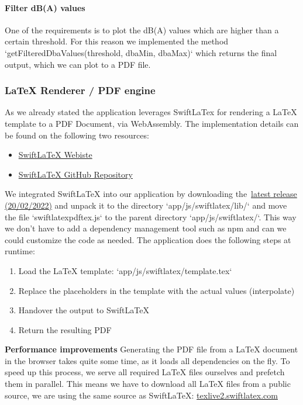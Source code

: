 \paragraph{Filter dB(A) values}
One of the requirements is to plot the dB(A) values which are higher than a certain threshold.
For this reason we implemented the method `getFilteredDbaValues(threshold, dbaMin, dbaMax)` which returns the final output,
which we can plot to a PDF file.

\subsubsection{LaTeX Renderer / PDF engine}\label{subsubsec:latex-renderer-pdf-engine}
As we already stated the application leverages SwiftLaTex for rendering a LaTeX template to a PDF Document, via WebAssembly.
The implementation details can be found on the following two resources:

\begin{itemize}
    \item \href{https://www.swiftlatex.com/}{SwiftLaTeX Webiste}
    \item \href{https://github.com/SwiftLaTeX/SwiftLaTeX/}{SwiftLaTeX GitHub Repository}
\end{itemize}

We integrated SwiftLaTeX into our application by downloading the~\href{https://github.com/SwiftLaTeX/SwiftLaTeX/releases/tag/v20022022}{latest release (20/02/2022)}
and unpack it to the directory `app/js/swiftlatex/lib/` and move the file `swiftlatexpdftex.js` to the parent directory `app/js/swiftlatex/`.
This way we don't have to add a dependency management tool such as npm and can we could customize the code as needed.
The application does the following steps at runtime:
\begin{enumerate}
    \item Load the LaTeX template: `app/js/swiftlatex/template.tex`
    \item Replace the placeholders in the template with the actual values (interpolate)
    \item Handover the output to SwiftLaTeX
    \item Return the resulting PDF
\end{enumerate}

\textbf{Performance improvements}
Generating the PDF file from a LaTeX document in the browser takes quite some time, as it loads all dependencies on the fly.
To speed up this process, we serve all required LaTeX files ourselves and prefetch them in parallel.
This means we have to download all LaTeX files from a public source, we are using the same source as SwiftLaTeX:
\href{https://texlive2.swiftlatex.com/}{texlive2.swiftlatex.com}

